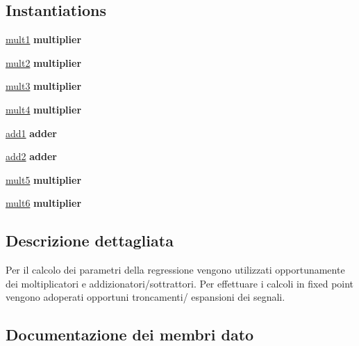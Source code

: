 \subsection*{Instantiations}
 \begin{DoxyCompactItemize}
\item 
\hyperlink{class_linear_regression_1_1_structural_abe2dbada52541335e367815bffe06c28}{mult1}  {\bfseries multiplier}   
\item 
\hyperlink{class_linear_regression_1_1_structural_a7c5c7b6fb03b66e49b0eb767162f01a8}{mult2}  {\bfseries multiplier}   
\item 
\hyperlink{class_linear_regression_1_1_structural_adf80c8ef67f9eb716830cfb9a6d3a980}{mult3}  {\bfseries multiplier}   
\item 
\hyperlink{class_linear_regression_1_1_structural_a65ae62ab3b1e6675bf4e4bcf572d2025}{mult4}  {\bfseries multiplier}   
\item 
\hyperlink{class_linear_regression_1_1_structural_adea88291834bfbc1cfe284774c792d37}{add1}  {\bfseries adder}   
\item 
\hyperlink{class_linear_regression_1_1_structural_a09e3b860880a85f376374594ffd092fb}{add2}  {\bfseries adder}   
\item 
\hyperlink{class_linear_regression_1_1_structural_aed551c15ed15fe4ab7d0c073a7e33b9c}{mult5}  {\bfseries multiplier}   
\item 
\hyperlink{class_linear_regression_1_1_structural_afa25d32bbc0881baaa179e393e1964c5}{mult6}  {\bfseries multiplier}   
\end{DoxyCompactItemize}


\subsection{Descrizione dettagliata}
Per il calcolo dei parametri della regressione vengono utilizzati opportunamente dei moltiplicatori e addizionatori/sottrattori. Per effettuare i calcoli in fixed point vengono adoperati opportuni troncamenti/ espansioni dei segnali.  

\subsection{Documentazione dei membri dato}
